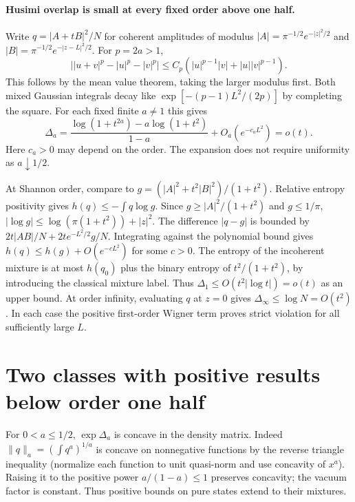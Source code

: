 \documentclass[11pt]{article}
\newcommand{\D}{\Delta}
\begin{document}
\paragraph{Husimi overlap is small at every fixed order above one half.}
Write $q=|A+tB|^2/N$ for coherent amplitudes of modulus $|A|=\pi^{-1/2}e^{-|z|^2/2}$ and $|B|=\pi^{-1/2}e^{-|z-L|^2/2}$. For $p=2a>1$,
\[
 \big||u+v|^p-|u|^p-|v|^p\big|
 \le C_p(|u|^{p-1}|v|+|u||v|^{p-1}).
\]
This follows by the mean value theorem, taking the larger modulus first. Both mixed Gaussian integrals decay like $\exp[-(p-1)L^2/(2p)]$ by completing the square. For each fixed finite $a\ne1$ this gives
\[
 \D_a=\frac{\log(1+t^{2a})-a\log(1+t^2)}{1-a}+O_a(e^{-c_a L^2})
       =o(t).
\]
Here $c_a>0$ may depend on the order. The expansion does not require uniformity as $a\downarrow1/2$.

At Shannon order, compare to $g=(|A|^2+t^2|B|^2)/(1+t^2)$. Relative entropy positivity gives $h(q)\le-\int q\log g$. Since $g\ge|A|^2/(1+t^2)$ and $g\le1/\pi$, $|\log g|\le \log(\pi(1+t^2))+|z|^2$. The difference $|q-g|$ is bounded by $2t|AB|/N+2te^{-L^2/2}g/N$. Integrating against the polynomial bound gives $h(q)\le h(g)+O(e^{-cL^2})$ for some $c>0$. The entropy of the incoherent mixture is at most $h(q_0)$ plus the binary entropy of $t^2/(1+t^2)$, by introducing the classical mixture label. Thus $\D_1\le O(t^2|\log t|)=o(t)$ as an upper bound. At order infinity, evaluating $q$ at $z=0$ gives $\D_\infty\le\log N=O(t^2)$. In each case the positive first-order Wigner term proves strict violation for all sufficiently large $L$.

\section*{Two classes with positive results below order one half}
For $0<a\le1/2$, $\exp\D_a$ is concave in the density matrix. Indeed $\|q\|_a=(\int q^a)^{1/a}$ is concave on nonnegative functions by the reverse triangle inequality (normalize each function to unit quasi-norm and use concavity of $x^a$). Raising it to the positive power $a/(1-a)\le1$ preserves concavity; the vacuum factor is constant. Thus positive bounds on pure states extend to their mixtures.
\end{document}
